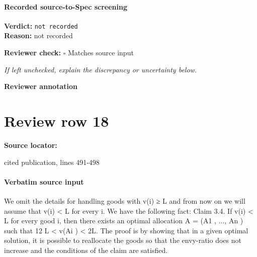 \documentclass[10pt]{article}
\newcommand{\reviewerbox}{%
  \par\noindent\fbox{\parbox{0.96\linewidth}{\rule{0pt}{0.38in}}}\par
}
\newcommand{\reviewmatch}[1]{%
  \par\noindent\textbf{Reviewer check:} $\square$\; #1\par
  \noindent\emph{If left unchecked, explain the discrepancy or uncertainty below.}\par
}
\begin{document}
\paragraph{Recorded source-to-Spec screening}
\textbf{Verdict:} \texttt{not recorded}
\\
\textbf{Reason:} not recorded
\reviewmatch{Matches source input}
\noindent\textbf{Reviewer annotation}\par
\reviewerbox
\clearpage
\hypertarget{source-claim-8d75c815e22f5d1b}{}
\section*{Review row 18}
\textbf{Source locator:} {\footnotesize\raggedright cited publication, lines 491-\allowbreak{}498\par}
\paragraph{Verbatim source input}
\begin{ReviewVerbatim}
We omit the details for handling goods with v(i) ≥ L and
from now on we will assume that v(i) < L for every i. We
have the following fact:
Claim 3.4. If v(i) < L for every good i, then there exists an optimal allocation A = (A1 , ..., An ) such that 12 L <
v(Ai ) < 2L.
The proof is by showing that in a given optimal solution, it
is possible to reallocate the goods so that the envy-ratio does
not increase and the conditions of the claim are satisfied.
\end{ReviewVerbatim}
\end{document}
